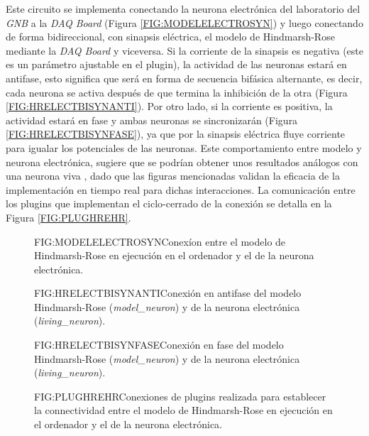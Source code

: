 
Este circuito se implementa conectando la neurona electrónica del laboratorio del \textit{GNB} \cite{Szcs2000} a la \textit{DAQ Board} (Figura \ref{FIG:MODELELECTROSYN}) y luego conectando de forma bidireccional, con sinapsis eléctrica, el modelo de Hindmarsh-Rose \cite{Hindmarsh1984, Golowasch1999} mediante la \textit{DAQ Board} y viceversa. Si la corriente de la sinapsis es negativa (este es un parámetro ajustable en el plugin), la actividad de las neuronas estará en antifase, esto significa que será en forma de secuencia bifásica alternante, es decir, cada neurona se activa después de que termina la inhibición de la otra (Figura \ref{FIG:HRELECTBISYNANTI}). Por otro lado, si la corriente es positiva, la actividad estará en fase y ambas neuronas se sincronizarán (Figura \ref{FIG:HRELECTBISYNFASE}), ya que por la sinapsis eléctrica fluye corriente para igualar los potenciales de las neuronas. Este comportamiento entre modelo y neurona electrónica, sugiere que se podrían obtener unos resultados análogos con una neurona viva \cite{Pinto2000}, dado que las figuras mencionadas validan la eficacia de la implementación en tiempo real para dichas interacciones. La comunicación entre los plugins que implementan el ciclo-cerrado de la conexión se detalla en la Figura \ref{FIG:PLUGHREHR}.

\begin{figure}[Esquema de la conexión entre el modelo y la neurona electrónica]{FIG:MODELELECTROSYN}{Conexíon entre el modelo de Hindmarsh-Rose en ejecución en el ordenador y el de la neurona electrónica.}
\end{figure}\textbf{}

\begin{figure}[Conexión bidireccional modelo-electrónica en antifase]{FIG:HRELECTBISYNANTI}{Conexión en antifase del modelo Hindmarsh-Rose (\textit{model\_neuron}) y de la neurona electrónica (\textit{living\_neuron}).}
\end{figure}

\begin{figure}[Conexión bidireccional modelo-electrónica en fase]{FIG:HRELECTBISYNFASE}{Conexión en fase del modelo Hindmarsh-Rose (\textit{model\_neuron}) y de la neurona electrónica (\textit{living\_neuron}).}
\end{figure}

\begin{figure}[Esquema de conexión de plugins para crear el circuito entre el modelo y la neurona electrónica]{FIG:PLUGHREHR}{Conexiones de plugins realizada para establecer la connectividad entre el modelo de Hindmarsh-Rose en ejecución en el ordenador y el de la neurona electrónica.}
\end{figure}\textbf{}

